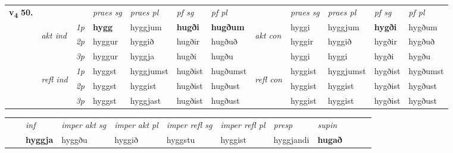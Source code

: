 \begin{tabular}{llllllllllll} \toprule
\multirow{4}{*}{{{\textbf{v{\textsubscript{4}}} \Large{\textbf{50.}}}}}  & &   &  \textit{praes sg}  & \textit{praes pl}  &\textit{ pf sg} & \textit{pf pl} &  &  \textit{praes sg}  & \textit{praes pl}  & \textit{pf sg} & \textit{pf pl } \\*
	\cmidrule{4-7} \cmidrule{9-12}
 & \multirow{3}{*}{\begin{turn}{90}\textit{akt ind}\end{turn}} & {\textit{1p}} & \textbf{hygg} & hyggjum    & \textbf{hugði} & \textbf{hugðum} & \multirow{3}{*}{\begin{turn}{90}\textit{akt con}\end{turn}} &hyggi & hyggjum & \textbf{hygði} & hygðum\\*
& &  {\textit{2p}} &  hyggur  & hyggið   & hugðir & hugðuð & & hyggir & hyggið & hygðir & hygðuð \\*
& &  {\textit{3p}} & hyggur & hyggja   & hugði & hugðu & & hyggi & hyggi& hygði & hygðu  \\*
\cmidrule{4-7} \cmidrule{9-12}
 &\multirow{3}{*}{\begin{turn}{90}\textit{refl ind}\end{turn}} & {\textit{1p}} & hyggst & hyggjumst    & hugðist & hugðumst & \multirow{3}{*}{\begin{turn}{90}\textit{refl con}\end{turn}}  &hyggist & hyggjumst & hygðist & hygðumst\\*
 &&  {\textit{2p}} &  hyggst  & hyggist   & hugðist & hugðust & &hyggist & hyggist & hygðist & hygðust \\*
& &  {\textit{3p}} & hyggst & hyggjast   & hugðist & hugðust & & hyggist & hyggist& hygðist & hygðust  \\*
\cmidrule{4-7} \cmidrule{9-12}
\end{tabular}


\begin{tabular}{llllllllllll}
 & & \textit{inf} & \textit{imper akt sg} & \textit{imper akt pl} & \textit{imper refl sg} & \textit{imper refl pl} & \textit{presp} & \textit{supin}       \\*
  & & \textbf{hyggja} & hyggðu  & hyggið & hyggstu & hyggist & hyggjandi &  \textbf{hugað}   \\*
\cmidrule{1-12}
\end{tabular}



